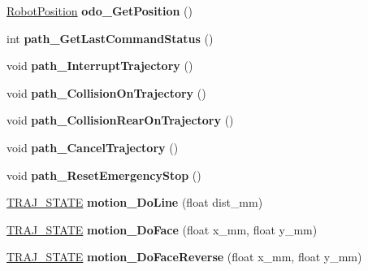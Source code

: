 \begin{DoxyCompactItemize}
\mbox{\label{classAsservEsialR_a498af11ad6c351bbc908e1d81ff44044}} 
\hyperlink{structRobotPosition}{Robot\+Position} {\bfseries odo\+\_\+\+Get\+Position} ()
\item 
\mbox{\label{classAsservEsialR_a05e8f01586ff447aa362a99ca370cb1c}} 
int {\bfseries path\+\_\+\+Get\+Last\+Command\+Status} ()
\item 
\mbox{\label{classAsservEsialR_afd68af9e59ff80e079d3b080516be850}} 
void {\bfseries path\+\_\+\+Interrupt\+Trajectory} ()
\item 
\mbox{\label{classAsservEsialR_a6b193a4388b5e6fd562ff151e55c734b}} 
void {\bfseries path\+\_\+\+Collision\+On\+Trajectory} ()
\item 
\mbox{\label{classAsservEsialR_ab4381768623b06e165aedba58bdded56}} 
void {\bfseries path\+\_\+\+Collision\+Rear\+On\+Trajectory} ()
\item 
\mbox{\label{classAsservEsialR_a1ad80dbe60204917444a820d70c6b194}} 
void {\bfseries path\+\_\+\+Cancel\+Trajectory} ()
\item 
\mbox{\label{classAsservEsialR_a89c3ed56d870037964c23bb657c75a7a}} 
void {\bfseries path\+\_\+\+Reset\+Emergency\+Stop} ()
\item 
\mbox{\label{classAsservEsialR_a163832308cf0ea6fb9826fd93950c7bf}} 
\hyperlink{path__manager_8h_adb3360abeb29758da93865c8afcb80eb}{T\+R\+A\+J\+\_\+\+S\+T\+A\+TE} {\bfseries motion\+\_\+\+Do\+Line} (float dist\+\_\+mm)
\item 
\mbox{\label{classAsservEsialR_a6a899cd76df83e244789f7b1f048ba84}} 
\hyperlink{path__manager_8h_adb3360abeb29758da93865c8afcb80eb}{T\+R\+A\+J\+\_\+\+S\+T\+A\+TE} {\bfseries motion\+\_\+\+Do\+Face} (float x\+\_\+mm, float y\+\_\+mm)
\item 
\mbox{\label{classAsservEsialR_a586ce569271c0cd970df536b1c1d38d1}} 
\hyperlink{path__manager_8h_adb3360abeb29758da93865c8afcb80eb}{T\+R\+A\+J\+\_\+\+S\+T\+A\+TE} {\bfseries motion\+\_\+\+Do\+Face\+Reverse} (float x\+\_\+mm, float y\+\_\+mm)

\end{DoxyCompactItemize}
